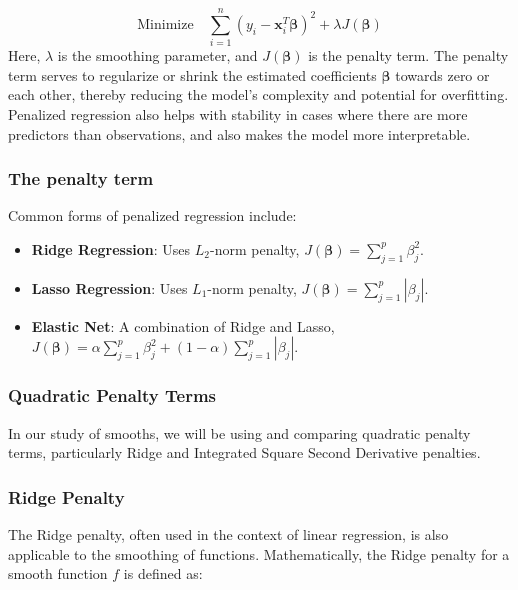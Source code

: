 \documentclass[12pt, twoside,hidelinks]{article}
\theoremstyle{definition}
\numberwithin{equation}{section}
\begin{document}
\begin{equation}
\text{Minimize} \quad \sum_{i=1}^{n} (y_i - \mathbf{x}_i^T \boldsymbol{\beta})^2 + \lambda J(\boldsymbol{\beta})
\end{equation}
 \cite{wood2017}
 \newline
Here, \( \lambda \) is the smoothing parameter, and \( J(\boldsymbol{\beta}) \) is the penalty term. The penalty term serves to regularize or shrink the estimated coefficients \( \boldsymbol{\beta} \) towards zero or each other, thereby reducing the model's complexity and potential for overfitting.
Penalized regression also helps with stability in cases where 
there are more predictors than observations, and also makes the model more interpretable.




\subsubsection{The penalty term}

Common forms of penalized regression include:

\begin{itemize}
    \item \textbf{Ridge Regression}: Uses \( L_2 \)-norm penalty, \( J(\boldsymbol{\beta}) = \sum_{j=1}^{p} \beta_j^2 \).
    \item \textbf{Lasso Regression}: Uses \( L_1 \)-norm penalty, \( J(\boldsymbol{\beta}) = \sum_{j=1}^{p} |\beta_j| \).
    \item \textbf{Elastic Net}: A combination of Ridge and Lasso, \( J(\boldsymbol{\beta}) = \alpha \sum_{j=1}^{p} \beta_j^2 + (1-\alpha) \sum_{j=1}^{p} |\beta_j| \).
\end{itemize}


\subsubsection{Quadratic Penalty Terms}

In our study of smooths, we will be using and comparing quadratic penalty terms, particularly Ridge and Integrated Square Second Derivative penalties.

\subsubsection*{Ridge Penalty}

The Ridge penalty, often used in the context of linear regression, is also applicable to the smoothing of functions. Mathematically, the Ridge penalty for a smooth function \( f \) is defined as:
\end{document}
